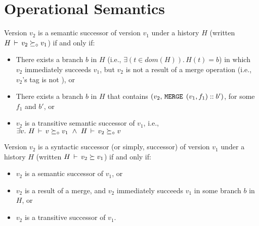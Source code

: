 \section{Operational Semantics}



\begin{definition} 
Version $v_2$ is a semantic successor of version $v_1$ under a history
$H$ (written $H\,\vdash\,v_2 \succeq_{\circ} v_1$) if and only if:
\begin{itemize}
  \item There exists a branch $b$ in $H$ (i.e., $\exists(t\in
  dom(H)).\,H(t) = b$) in which $v_2$ immediately succeeds
  $v_1$, but $v_2$ is not a result of a merge operation (i.e.,
  $v_2$'s tag is not ), or
  \item There exists a branch $b$ in $H$ that contains
  $(v_2, \,{\tt MERGE}\,\;(v_1,f_1)::b')$, for some $f_1$ and $b'$, or
  \item $v_2$ is a transitive semantic successor of $v_1$, i.e., 
  $\exists v.~ H\,\vdash\,v \succeq_{\circ} v_1 ~\wedge~ H\,\vdash\,v_2
  \succeq_{\circ} v$ 
\end{itemize}
\end{definition}

\begin{definition} 
Version $v_2$ is a syntactic successor (or simply, successor) of
version $v_1$ under a history $H$ (written $H\,\vdash\,v_2 \succeq
v_1$) if and only if:
\begin{itemize}
  \item $v_2$ is a semantic successor of $v_1$, or
  \item $v_2$ is a result of a merge, and $v_2$ immediately succeeds
  $v_1$ in some branch $b$ in $H$, or
  \item $v_2$ is a transitive successor of $v_1$.
\end{itemize}
\end{definition}
